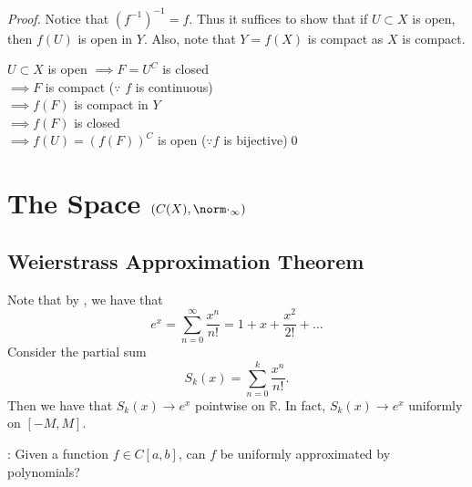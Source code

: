 \documentclass[notoc,notitlepage]{tufte-book}
\begin{document}
\begin{proof}
  Notice that $(f^{-1})^{-1} = f$. Thus it suffices to show that if $U \subset X$ is open, then $f(U)$ is open in $Y$. Also, note that $Y = f(X)$ is compact as $X$ is compact.

  \noindent
  $U \subset X$ is open $\implies F = U^C$ is closed \\
  $\implies F$ is compact ($\because$ $f$ is continuous) \\
  $\implies f(F)$ is compact in $Y$ \\
  $\implies f(F)$ is closed \\
  $\implies f(U) = (f(F))^C$ is open ($\because f$ is bijective)\qed\
\end{proof}


\section{The Space $(C(X), \norm\cdot_\infty)$}%
\label{sec:the_space_c_x_normcdot_infty_}

\subsection{Weierstrass Approximation Theorem}%
\label{sub:weierstrass_approximation_theorem}

\begin{eg}
  Note that by , we have that
  \begin{equation*}
    e^x = \sum_{n=0}^{\infty} \frac{x^n}{n!} = 1 + x + \frac{x^2}{2!} + \hdots
  \end{equation*}
  Consider the partial sum
  \begin{equation*}
    S_k(x) = \sum_{n=0}^{k} \frac{x^n}{n!}.
  \end{equation*}
  Then we have that $S_k(x) \to e^x$ pointwise on $\mathbb{R}$. In fact, $S_k(x) \to e^x$ uniformly on $[-M, M]$.
\end{eg}

: Given a function $f \in C[a, b]$, can $f$ be uniformly approximated by polynomials?
\end{document}
